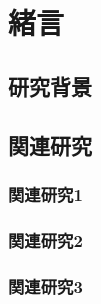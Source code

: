 \section{緒言}
\label{chap:introduction}
\subsection{研究背景}
\label{sec:back_ground}

\subsection{関連研究}
\label{sec:related_works}

\clearpage

\subsubsection{関連研究1}
\label{sec:robot_pouring_human_skill}

\subsubsection{関連研究2}
\label{sec:visual-based_pouring_motion}

\subsubsection{関連研究3}
\label{sec:tactile-based_manipulation}

